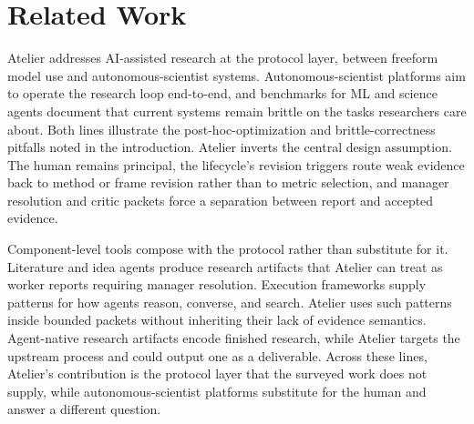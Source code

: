 \section{Related Work}
\label{sec:related}

Atelier addresses AI-assisted research at the protocol layer, between freeform model use and autonomous-scientist systems. Autonomous-scientist platforms \citep{lu2024aiscientist, gottweis2025aicoscientist} aim to operate the research loop end-to-end, and benchmarks for ML and science agents \citep{chan2024mlebench, chen2024scienceagentbench} document that current systems remain brittle on the tasks researchers care about. Both lines illustrate the post-hoc-optimization and brittle-correctness pitfalls noted in the introduction. Atelier inverts the central design assumption. The human remains principal, the lifecycle's revision triggers route weak evidence back to method or frame revision rather than to metric selection, and manager resolution and critic packets force a separation between report and accepted evidence.

Component-level tools compose with the protocol rather than substitute for it. Literature and idea agents \citep{baek2024researchagent, skarlinski2024paperqa} produce research artifacts that Atelier can treat as worker reports requiring manager resolution. Execution frameworks \citep{yao2023react, wu2023autogen, jiang2025aide} supply patterns for how agents reason, converse, and search. Atelier uses such patterns inside bounded packets without inheriting their lack of evidence semantics. Agent-native research artifacts \citep{liu2026ara} encode finished research, while Atelier targets the upstream process and could output one as a deliverable. Across these lines, Atelier's contribution is the protocol layer that the surveyed work does not supply, while autonomous-scientist platforms substitute for the human and answer a different question.
